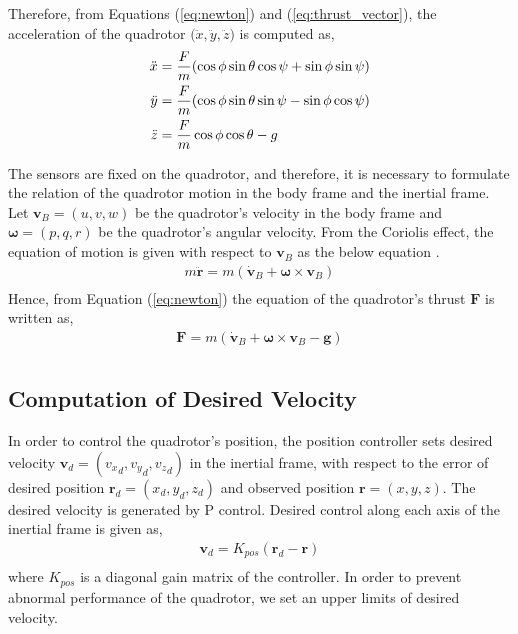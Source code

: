 Therefore, from Equations (\ref{eq:newton}) and (\ref{eq:thrust_vector}), the acceleration of the quadrotor \({(\ddot{x}}, {\ddot{y}}, {\ddot{z}})\) is computed as,
\begin{equation}
\begin{aligned}
{{\ddot x} } & =  {F \over m} (\cos{\phi} \sin{\theta} \cos{\psi} + \sin{\phi} \sin{\psi})\\
{{\ddot y} } & =  {F \over m} (\cos{\phi} \sin{\theta} \sin{\psi} - \sin{\phi} \cos{\psi})\\
{{\ddot z} } & =  {F \over m} \cos{\phi} \cos{\theta} -g\\
\end{aligned}
\end{equation}

The sensors are fixed on the quadrotor, and therefore, it is necessary to formulate the relation of the quadrotor motion in the body frame and the inertial frame. Let \({\boldsymbol v}_B = (u, v, w)\) be the quadrotor's velocity in the body frame and \({\boldsymbol \omega} = (p, q, r)\) be the quadrotor's angular velocity. From the Coriolis effect, the equation of motion is given with respect to \( {\boldsymbol v}_B \) as the below equation \cite{randal08}.
\begin{equation}
\label{eq:newton_gravity}
\begin{aligned}
m \ddot{{\boldsymbol{r}}} = m (\dot{{\boldsymbol v}}_B + {\boldsymbol \omega} \times {\boldsymbol v}_B)\\
\end{aligned}
\end{equation}
Hence, from Equation (\ref{eq:newton}) the equation of the quadrotor's thrust \({\boldsymbol F}\) is written as,
\begin{equation}
\begin{aligned}
\boldsymbol{F} = m (\dot{{\boldsymbol v}}_B + {\boldsymbol \omega} \times {\boldsymbol v}_B- \boldsymbol{g})\\
\end{aligned}
\end{equation}

\subsection{Computation of Desired Velocity}
In order to control the quadrotor's position, the position controller sets desired velocity \({\boldsymbol v}_d = ({v_x}_d, {v_y}_d, {v_z}_d) \) in the inertial frame, with respect to the error of desired position \( {\boldsymbol{r}}_d = ({x_d} , {y_d} , {z_d} ) \) and observed position \( {{\boldsymbol{r}}}  = ({{x}} , {{y}} , {{z}} )\). The desired velocity is generated by P control. Desired control along each axis of the inertial frame is given as,
\begin{equation}
\begin{aligned}
{\boldsymbol v}_d = K_{pos} ( {\boldsymbol r}_d - {\boldsymbol r})\\
\end{aligned}
\end{equation}
where \( K_{pos} \) is a diagonal gain matrix of the controller. In order to prevent abnormal performance of the quadrotor, we set an upper limits of desired velocity. 

